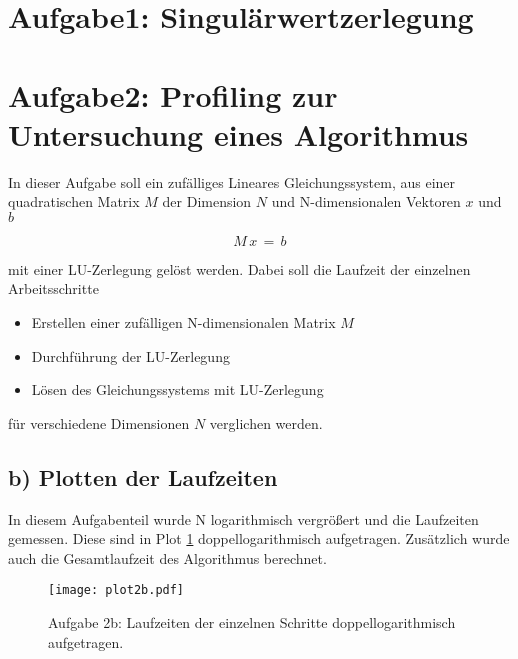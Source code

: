 



\maketitle

\section*{Aufgabe1: Singulärwertzerlegung}

\section*{Aufgabe2: Profiling zur Untersuchung eines Algorithmus}
In dieser Aufgabe soll ein zufälliges Lineares Gleichungssystem, aus einer quadratischen Matrix $M$ der Dimension $N$ und N-dimensionalen Vektoren $x$ und $b$

\begin{equation*}
  M\, x\, =\, b
\end{equation*}

\noindent
mit einer LU-Zerlegung gelöst werden. Dabei soll die Laufzeit der einzelnen Arbeitsschritte

\begin{itemize}
  \item[1)] Erstellen einer zufälligen N-dimensionalen Matrix $M$
  \item[2)] Durchführung der LU-Zerlegung
  \item[3)] Lösen des Gleichungssystems mit LU-Zerlegung
\end{itemize}

\noindent
für verschiedene Dimensionen $N$ verglichen werden.

\subsection*{b) Plotten der Laufzeiten}
In diesem Aufgabenteil wurde N logarithmisch vergrößert und die Laufzeiten gemessen. Diese sind in Plot \ref{fig:plot2b} doppellogarithmisch aufgetragen. Zusätzlich wurde auch die Gesamtlaufzeit des Algorithmus berechnet.

\FloatBarrier
\begin{figure}[h]
    \centering
    \texttt{[image: plot2b.pdf]}
    \caption{Aufgabe 2b: Laufzeiten der einzelnen Schritte doppellogarithmisch aufgetragen.}
    \label{fig:plot2b}
\end{figure}
\FloatBarrier

